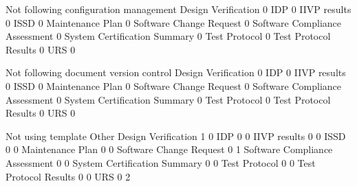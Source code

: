 \documentclass{article}
\begin{document}
\begin{Schunk}
\begin{Soutput}
                                 Not following configuration management
  Design Verification                                                 0
  IDP                                                                 0
  IIVP results                                                        0
  ISSD                                                                0
  Maintenance Plan                                                    0
  Software Change Request                                             0
  Software Compliance Assessment                                      0
  System Certification Summary                                        0
  Test Protocol                                                       0
  Test Protocol Results                                               0
  URS                                                                 0
                                
                                 Not following document version control
  Design Verification                                                 0
  IDP                                                                 0
  IIVP results                                                        0
  ISSD                                                                0
  Maintenance Plan                                                    0
  Software Change Request                                             0
  Software Compliance Assessment                                      0
  System Certification Summary                                        0
  Test Protocol                                                       0
  Test Protocol Results                                               0
  URS                                                                 0
                                
                                 Not using template Other
  Design Verification                             1     0
  IDP                                             0     0
  IIVP results                                    0     0
  ISSD                                            0     0
  Maintenance Plan                                0     0
  Software Change Request                         0     1
  Software Compliance Assessment                  0     0
  System Certification Summary                    0     0
  Test Protocol                                   0     0
  Test Protocol Results                           0     0
  URS                                             0     2
                                

\end{Soutput}
\end{Schunk}
\end{document}
